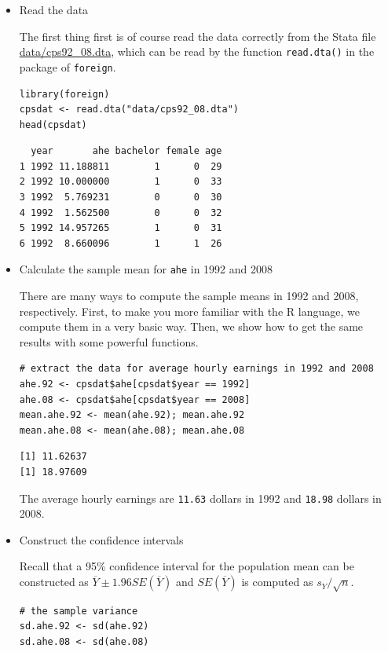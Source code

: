 \documentclass[a4paper,11pt]{article}
\begin{document}
\begin{itemize}
\item Read the data
\label{sec:orga6659d0}

The first thing first is of course read the data correctly from the
Stata file \url{data/cps92\_08.dta}, which can be read by the function
\texttt{read.dta()} in the package of \texttt{foreign}.

\begin{verbatim}
library(foreign)
cpsdat <- read.dta("data/cps92_08.dta")
head(cpsdat)
\end{verbatim}

\begin{verbatim}
  year       ahe bachelor female age
1 1992 11.188811        1      0  29
2 1992 10.000000        1      0  33
3 1992  5.769231        0      0  30
4 1992  1.562500        0      0  32
5 1992 14.957265        1      0  31
6 1992  8.660096        1      1  26
\end{verbatim}

\item Calculate the sample mean for \texttt{ahe} in 1992 and 2008
\label{sec:orgd0b04ae}

There are many ways to compute the sample means in 1992 and 2008,
respectively. First, to make you more familiar with the  R
language, we compute them in a very basic way. Then, we show how to
get the same results with some powerful functions.

\begin{verbatim}
# extract the data for average hourly earnings in 1992 and 2008
ahe.92 <- cpsdat$ahe[cpsdat$year == 1992]
ahe.08 <- cpsdat$ahe[cpsdat$year == 2008]
mean.ahe.92 <- mean(ahe.92); mean.ahe.92
mean.ahe.08 <- mean(ahe.08); mean.ahe.08
\end{verbatim}

\begin{verbatim}
[1] 11.62637
[1] 18.97609
\end{verbatim}

The average hourly earnings are \texttt{11.63} dollars
in 1992 and \texttt{18.98} dollars in 2008.

\item Construct the confidence intervals
\label{sec:org6f04366}

Recall that a 95\% confidence interval for the population mean can be
constructed as \(\overline{Y} \pm 1.96 SE(\overline{Y})\) and
\(SE(\overline{Y})\) is computed as \(s_Y / \sqrt{n}\).

\begin{verbatim}
# the sample variance
sd.ahe.92 <- sd(ahe.92)
sd.ahe.08 <- sd(ahe.08)


\end{verbatim}
\end{itemize}
\end{document}
